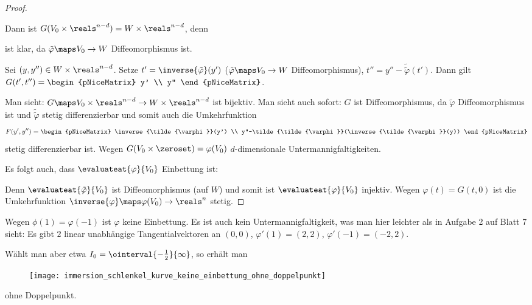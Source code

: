 \begin{proof}
\begin{subproof}
\begin{equation*}
    \end{equation*}
    Dann ist \( G(V_0\times\reals^{n-d})=W\times\reals^{n-d} \), denn
    \begin{proofdescription}
      \item[\sethin] ist klar, da \( \tilde{\varphi}\maps V_0\to W \) Diffeomorphismus ist.
      \item[\setrueck] Sei \( (y,y'')\in W\times\reals^{n-d} \). Setze \( t'=\inverse{\tilde{\varphi}}(y') \) (\( \tilde{\varphi}\maps V_0\to W \) Diffeomorphismus), \( t''=y''-\tilde{\tilde{\varphi}}(t') \). Dann gilt \( G(t',t'')=\begin{pNiceMatrix} y' \\ y'' \end{pNiceMatrix} \).
    \end{proofdescription}
    Man sieht:  \( G\maps V_0\times\reals^{n-d}\to W\times\reals^{n-d} \) ist bijektiv. Man sieht auch sofort: \( G \) ist Diffeomorphismus, da \( \tilde{\varphi} \) Diffeomorphismus ist und \( \tilde{\tilde{\varphi}} \) stetig differenzierbar und somit auch die Umkehrfunktion
    \begin{equation*}
      F(y',y'')=\begin{pNiceMatrix} \inverse{\tilde{\varphi}}(y') \\ y''-\tilde{\tilde{\varphi}}(\inverse{\tilde{\varphi}}(y)) \end{pNiceMatrix}
    \end{equation*}
    stetig differenzierbar ist. Wegen \( G(V_0\times \zeroset) =\varphi(V_0)\) \( d \)-dimensionale Untermannigfaltigkeiten.
  \end{subproof}
  Es folgt auch, dass \( \evaluateat{\varphi}{V_0} \) Einbettung ist:
  
  Denn \(\evaluateat{\tilde{\varphi}}{V_0}  \)
   ist Diffeomorphismus (auf \( W \)) und somit ist
    \( \evaluateat{\varphi}{V_0} \) 
    injektiv. Wegen 
    \( \varphi(t)=G(t,0) \) 
    ist die Umkehrfunktion
     \( \inverse{\varphi}\maps \varphi(V_0)\to \reals^n \) 
     stetig.
\end{proof}
\begin{beispiel*}
  Wegen \( \phi(1)=\varphi(-1) \) ist \( \varphi \) keine Einbettung. Es ist auch kein Untermannigfaltigkeit, was man hier leichter als in Aufgabe 2 auf Blatt 7 sieht: Es gibt \( 2 \) linear unabhängige Tangentialvektoren an \( (0,0) \), \zb \( \varphi'(1)=(2,2) \), \( \varphi'(-1)=(-2,2) \). 
  
  Wählt man aber etwa \( I_0=\ointerval{-\frac{1}{2}}{\infty} \), so erhält man
  \begin{figure}[H]
    \centering
    \texttt{[image: immersion\_schlenkel\_kurve\_keine\_einbettung\_ohne\_doppelpunkt]}
    \label{fig:immersion_schlenkel_kurve_keine_einbettung_ohne_doppelpunkt}
  \end{figure}
  ohne Doppelpunkt.
\end{beispiel*}
